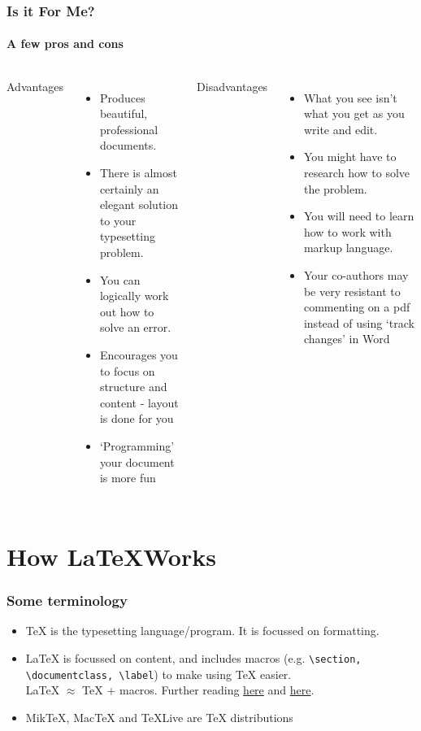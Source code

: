 \documentclass{beamer}
\begin{document}
\begin{frame} \frametitle{Is it For Me?}
	\framesubtitle{A few pros and cons}
	\begin{columns}[t]
		Advantages
			\begin{itemize}
				\item Produces beautiful, professional documents.
				\item There is almost certainly an elegant solution to your typesetting problem.
				\item You can logically work out how to solve an error.
				\item Encourages you to focus on structure and content - layout is done for you
				\item `Programming' your document is more fun
			\end{itemize}
		Disadvantages
			\begin{itemize}
				\item What you see isn't what you get as you write and edit.
				\item You might have to research how to solve the problem.
				\item You will need to learn how to work with markup language.
				\item Your co-authors may be very resistant to commenting on a pdf instead of using `track changes' in Word
			\end{itemize}
	\end{columns}
\end{frame}

\section{How \LaTeX Works}

\begin{frame}[fragile] \frametitle{Some terminology}
	\begin{itemize}
		\item \TeX{} is the typesetting language/program. It is focussed on formatting.
		\item \LaTeX{} is focussed on content, and includes macros (e.g. \verb|\section, \documentclass, \label|) to make using \TeX{} easier.\\
		\LaTeX{} $\approx$ \TeX{} + macros. Further reading \href{https://www.texpad.com/support/latex/advanced/tex-vs-latex}{here} and  \href{http://www.tex.ac.uk/faq/FAQ-texthings.html}{here}.
		\item Mik\TeX, Mac\TeX{} and \TeX{}Live are \TeX{} distributions
	\end{itemize}
\end{frame}
\end{document}
